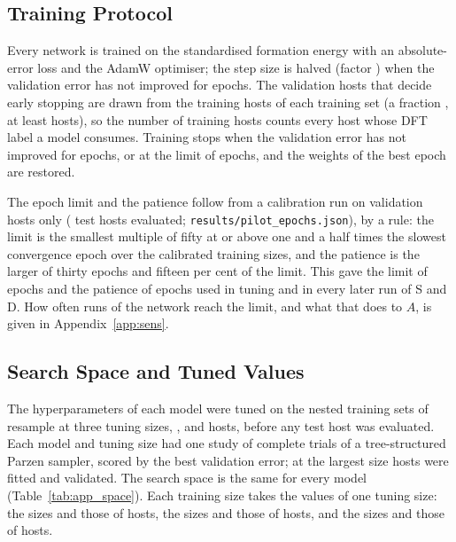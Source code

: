 \subsection{Training Protocol}

Every network is trained on the standardised formation energy with an absolute-error loss and the AdamW optimiser; the step size is halved (factor \numCfgTrainingSchedulerFactor{}) when the validation error has not improved for \numCfgTrainingSchedulerPatience{} epochs. The validation hosts that decide early stopping are drawn from the training hosts of each training set (a fraction \numCfgTrainingValidationFrac{}, at least \numCfgTrainingValidationMinHosts{} hosts), so the number of training hosts counts every host whose DFT label a model consumes. Training stops when the validation error has not improved for \numCfgTrainingEarlyStoppingPatience{} epochs, or at the limit of \numCfgTrainingMaxEpochs{} epochs, and the weights of the best epoch are restored.

The epoch limit and the patience follow from a calibration run on validation hosts only (\numPilotEpochsTestHostsEvaluated{} test hosts evaluated; \texttt{results/pilot\_epochs.json}), by a rule: the limit is the smallest multiple of fifty at or above one and a half times the slowest convergence epoch over the calibrated training sizes, and the patience is the larger of thirty epochs and fifteen per cent of the limit. This gave the limit of \numPilotEpochsMaxEpochs{} epochs and the patience of \numPilotEpochsPatience{} epochs used in tuning and in every later run of S and D. How often runs of the network reach the limit, and what that does to $A$, is given in Appendix~\ref{app:sens}.

\subsection{Search Space and Tuned Values}

The hyperparameters of each model were tuned on the nested training sets of resample \numCfgTuningAnchorResample{} at three tuning sizes, \numCfgTuningAnchorsItemOne{}, \numCfgTuningAnchorsItemTwo{} and \numCfgTuningAnchorsItemThree{} hosts, before any test host was evaluated. Each model and tuning size had one study of \numCfgTuningOptunaTrialsPerModelPerAnchor{} complete trials of a tree-structured Parzen sampler, scored by the best validation error; at the largest size \numTuningSummaryStudiesSASixHundredFiftyFourValidationNTrainHosts{} hosts were fitted and \numTuningSummaryStudiesSASixHundredFiftyFourValidationNValHosts{} validated. The search space is the same for every model (Table~\ref{tab:app_space}). Each training size takes the values of one tuning size: the sizes \numCfgBudgetsHostsItemOne{} and \numCfgBudgetsHostsItemTwo{} those of \numCfgTuningBudgetToAnchorTwentyFive{} hosts, the sizes \numCfgBudgetsHostsItemThree{} and \numCfgBudgetsHostsItemFour{} those of \numCfgTuningBudgetToAnchorOneHundred{} hosts, and the sizes \numCfgBudgetsHostsItemFive{} and \numCfgBudgetsHostsItemSix{} those of \numCfgTuningBudgetToAnchorFourHundred{} hosts.

